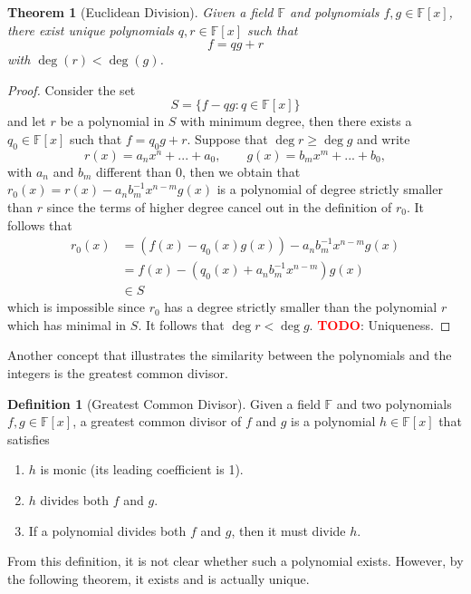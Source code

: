 \documentclass{article}
\theoremstyle{plain}
\newtheorem{theorem}{Theorem}[subsection]
\theoremstyle{definition}
\newtheorem*{definition}{Definition}
\newcommand{\F}{\mathbb{F}}
\newcommand{\td}{\textcolor{red}{\textbf{TODO}}}
\begin{document}
\begin{theorem}[Euclidean Division]
\label{Euclidean Division}
    Given a field $\F$ and polynomials $f,g \in \F[x]$, there exist unique polynomials $q,r \in \F[x]$ such that
    $$f = qg + r$$
    with $\deg(r) < \deg(g)$.
\end{theorem}

\begin{proof}
    Consider the set
    $$S = \{f-qg : q \in \F[x]\}$$
    and let $r$ be a polynomial in $S$ with minimum degree, then there exists a $q_0 \in \F[x]$ such that
    $f = q_0g + r$. Suppose that $\deg r \geq \deg g$ and write
    $$r(x) = a_n x^n + ... + a_0, \qquad g(x) = b_m x^m + ... + b_0,$$
    with $a_n$ and $b_m$ different than 0, then we obtain that $r_0(x) = r(x) - a_nb_m^{-1}x^{n-m}g(x)$ is a polynomial of degree strictly smaller than $r$ since the terms of higher degree cancel out in the definition of $r_0$. It follows that
    \begin{align*}
        r_0(x) &= (f(x) - q_0(x)g(x)) - a_nb_m^{-1}x^{n-m}g(x)\\ 
        &= f(x) - (q_0(x) + a_nb_m^{-1}x^{n-m})g(x)\\
        &\in S
    \end{align*}
    which is impossible since $r_0$ has a degree strictly smaller than the polynomial $r$ which has minimal in $S$. It follows that $\deg r < \deg g$. \td : Uniqueness.
\end{proof}

Another concept that illustrates the similarity between the polynomials and the integers is the greatest common divisor.

\begin{definition}[Greatest Common Divisor]
    Given a field $\F$ and two polynomials $f,g \in \F[x]$, a greatest common divisor of $f$ and $g$ is a polynomial $h \in \F[x]$ that satisfies
    \begin{enumerate}
        \item $h$ is monic (its leading coefficient is 1).
        \item $h$ divides both $f$ and $g$.
        \item If a polynomial divides both $f$ and $g$, then it must divide $h$.
    \end{enumerate}
\end{definition}

From this definition, it is not clear whether such a polynomial exists. However, by the following theorem, it exists and is actually unique.
\end{document}
